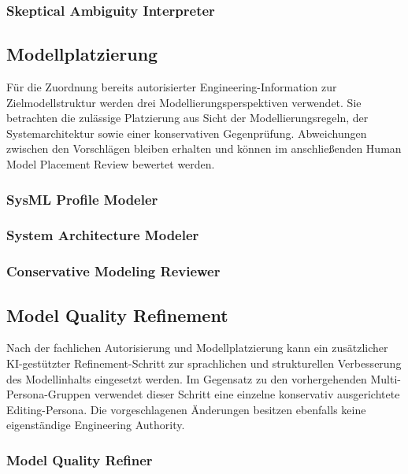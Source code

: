 \subsubsection*{Skeptical Ambiguity Interpreter}


\subsection{Modellplatzierung}
\label{app:personas_model_placement}
Für die Zuordnung bereits autorisierter Engineering-Information zur
Zielmodellstruktur werden drei Modellierungsperspektiven verwendet.
Sie betrachten die zulässige Platzierung aus Sicht der Modellierungsregeln,
der Systemarchitektur sowie einer konservativen Gegenprüfung. Abweichungen
zwischen den Vorschlägen bleiben erhalten und können im anschließenden
Human Model Placement Review bewertet werden.
\subsubsection*{SysML Profile Modeler}

\subsubsection*{System Architecture Modeler}

\subsubsection*{Conservative Modeling Reviewer}


\subsection{Model Quality Refinement}
\label{app:persona_model_quality}
Nach der fachlichen Autorisierung und Modellplatzierung kann ein
zusätzlicher KI-gestützter Refinement-Schritt zur sprachlichen und
strukturellen Verbesserung des Modellinhalts eingesetzt werden. Im Gegensatz
zu den vorhergehenden Multi-Persona-Gruppen verwendet dieser Schritt eine
einzelne konservativ ausgerichtete Editing-Persona. Die vorgeschlagenen
Änderungen besitzen ebenfalls keine eigenständige Engineering Authority.
\subsubsection*{Model Quality Refiner}
